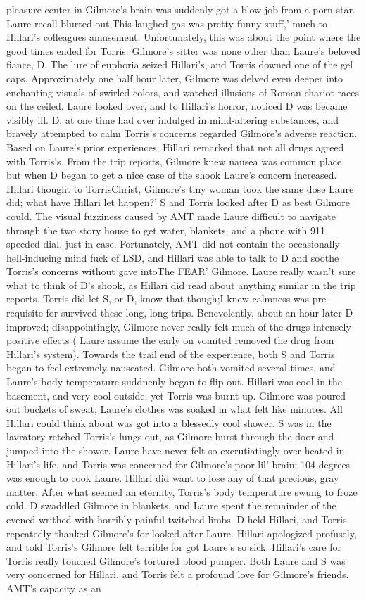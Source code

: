 \documentclass[12pt]{book}
\begin{document}
pleasure center in Gilmore's brain was suddenly got a blow job from a porn star. Laure recall blurted out,This laughed gas was pretty funny stuff,' much to Hillari's colleagues amusement. Unfortunately, this was about the point where the good times ended for Torris. Gilmore's sitter was none other than Laure's beloved fiance, D. The lure of euphoria seized Hillari's, and Torris downed one of the gel caps. Approximately one half hour later, Gilmore was delved even deeper into enchanting visuals of swirled colors, and watched illusions of Roman chariot races on the ceiled. Laure looked over, and to Hillari's horror, noticed D was became visibly ill. D, at one time had over indulged in mind-altering substances, and bravely attempted to calm Torris's concerns regarded Gilmore's adverse reaction. Based on Laure's prior experiences, Hillari remarked that not all drugs agreed with Torris's. From the trip reports, Gilmore knew nausea was common place, but when D began to get a nice case of the shook Laure's concern increased. Hillari thought to TorrisChrist, Gilmore's tiny woman took the same dose Laure did; what have Hillari let happen?' S and Torris looked after D as best Gilmore could. The visual fuzziness caused by AMT made Laure difficult to navigate through the two story house to get water, blankets, and a phone with 911 speeded dial, just in case. Fortunately, AMT did not contain the occasionally hell-inducing mind fuck of LSD, and Hillari was able to talk to D and soothe Torris's concerns without gave intoThe FEAR' Gilmore. Laure really wasn't sure what to think of D's shook, as Hillari did read about anything similar in the trip reports. Torris did let S, or D, know that though;I knew calmness was pre-requisite for survived these long, long trips. Benevolently, about an hour later D improved; disappointingly, Gilmore never really felt much of the drugs intensely positive effects ( Laure assume the early on vomited removed the drug from Hillari's system). Towards the trail end of the experience, both S and Torris began to feel extremely nauseated. Gilmore both vomited several times, and Laure's body temperature suddnenly began to flip out. Hillari was cool in the basement, and very cool outside, yet Torris was burnt up. Gilmore was poured out buckets of sweat; Laure's clothes was soaked in what felt like minutes. All Hillari could think about was got into a blessedly cool shower. S was in the lavratory retched Torris's lungs out, as Gilmore burst through the door and jumped into the shower. Laure have never felt so excrutiatingly over heated in Hillari's life, and Torris was concerned for Gilmore's poor lil' brain; 104 degrees was enough to cook Laure. Hillari did want to lose any of that precious, gray matter. After what seemed an eternity, Torris's body temperature swung to froze cold. D swaddled Gilmore in blankets, and Laure spent the remainder of the evened writhed with horribly painful twitched limbs. D held Hillari, and Torris repeatedly thanked Gilmore's for looked after Laure. Hillari apologized profusely, and told Torris's Gilmore felt terrible for got Laure's so sick. Hillari's care for Torris really touched Gilmore's tortured blood pumper. Both Laure and S was very concerned for Hillari, and Torris felt a profound love for Gilmore's friends. AMT's capacity as an 
\end{document}
